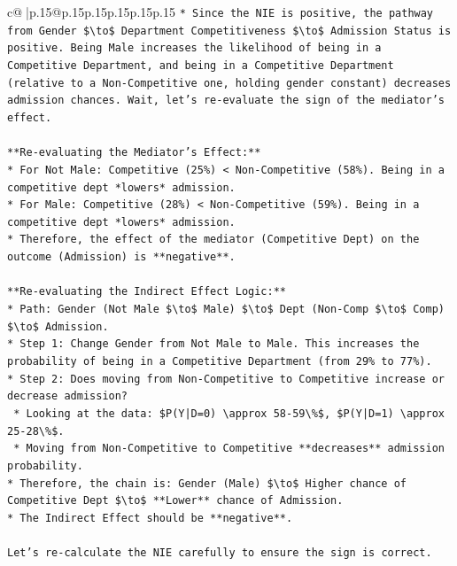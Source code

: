 \documentclass{article}
\begin{document}
{\begin{supertabular}{c@{$\;$}|p{.15\linewidth}@{}p{.15\linewidth}p{.15\linewidth}p{.15\linewidth}p{.15\linewidth}p{.15\linewidth}}
{{{\texttt{*   Since the NIE is positive, the pathway from Gender \$\textbackslash{}to\$ Department Competitiveness \$\textbackslash{}to\$ Admission Status is positive. Being Male increases the likelihood of being in a Competitive Department, and being in a Competitive Department (relative to a Non{-}Competitive one, holding gender constant) decreases admission chances. Wait, let's re{-}evaluate the sign of the mediator's effect.} \\
\\ 
\texttt{**Re{-}evaluating the Mediator's Effect:**} \\
\texttt{*   For Not Male: Competitive (25\%) < Non{-}Competitive (58\%). Being in a competitive dept *lowers* admission.} \\
\texttt{*   For Male: Competitive (28\%) < Non{-}Competitive (59\%). Being in a competitive dept *lowers* admission.} \\
\texttt{*   Therefore, the effect of the mediator (Competitive Dept) on the outcome (Admission) is **negative**.} \\
\\ 
\texttt{**Re{-}evaluating the Indirect Effect Logic:**} \\
\texttt{*   Path: Gender (Not Male \$\textbackslash{}to\$ Male) \$\textbackslash{}to\$ Dept (Non{-}Comp \$\textbackslash{}to\$ Comp) \$\textbackslash{}to\$ Admission.} \\
\texttt{*   Step 1: Change Gender from Not Male to Male. This increases the probability of being in a Competitive Department (from 29\% to 77\%).} \\
\texttt{*   Step 2: Does moving from Non{-}Competitive to Competitive increase or decrease admission?} \\
\texttt{    *   Looking at the data: \$P(Y|D=0) \textbackslash{}approx 58{-}59\textbackslash{}\%\$, \$P(Y|D=1) \textbackslash{}approx 25{-}28\textbackslash{}\%\$.} \\
\texttt{    *   Moving from Non{-}Competitive to Competitive **decreases** admission probability.} \\
\texttt{*   Therefore, the chain is: Gender (Male) \$\textbackslash{}to\$ Higher chance of Competitive Dept \$\textbackslash{}to\$ **Lower** chance of Admission.} \\
\texttt{*   The Indirect Effect should be **negative**.} \\
\\ 
\texttt{Let's re{-}calculate the NIE carefully to ensure the sign is correct.} \\
}}}
\end{supertabular}}
\end{document}
